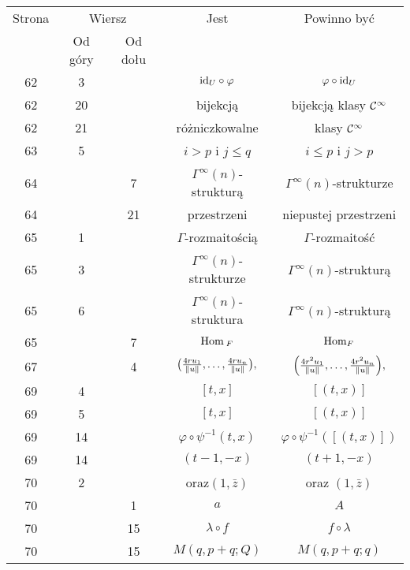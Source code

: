 \documentclass[a4paper,11pt]{article}
\begin{document}
\begin{center}
  \begin{tabular}{|c|c|c|c|c|}
    \hline
    Strona & \multicolumn{2}{c|}{Wiersz} & Jest
                              & Powinno być \\ \cline{2-3}
    & Od góry & Od dołu & & \\
    \hline
    62  & \hphantom{0}3 & & $\mathrm{id}_{ U } \circ \varphi$ & $\varphi \circ \mathrm{id}_{ U }$ \\
    62  & 20 & & bijekcją & bijekcją klasy $\mathcal{C}^{ \infty }$ \\
    62  & 21 & & różniczkowalne & klasy $\mathcal{C}^{ \infty }$ \\
    63  & \hphantom{0}5 & & $i > p$ i $j \leq q$ & $i \leq p$ i $j > p$ \\
    64  & & \hphantom{0}7 & $\Gamma^{ \infty }( n )$-strukturą
    & $\Gamma^{ \infty }( n )$-strukturze \\
    64  & & 21 & przestrzeni & niepustej przestrzeni \\
    65  & \hphantom{0}1 & & $\Gamma$-rozmaitością & $\Gamma$-rozmaitość \\
    65  & \hphantom{0}3 & & $\Gamma^{ \infty }( n )$-strukturze
           & $\Gamma^{ \infty }( n )$-strukturą \\
    65  & \hphantom{0}6 & & $\Gamma^{ \infty }( n )$-struktura
           & $\Gamma^{ \infty }( n )$-strukturą \\
    65  & & \hphantom{0}7 & $\mathrm{Hom}_{ \: F }$ & $\mathrm{Hom}_{ F }$ \\
    67  & & \hphantom{0}4 & $\big( \frac{ 4 r u_{ 1 } }{ \lVert{  u  }\rVert }, \ldots,
                 \frac{ 4 r u_{ n } }{ \lVert{  u  }\rVert } \big),$
           & $\left( \frac{ 4 r^{ 2 } u_{ 1 } }{ \lVert{  u  }\rVert }, \ldots,
             \frac{ 4 r^{ 2 } u_{ n } }{ \lVert{  u  }\rVert } \right)\! ,$ \\
    69  & \hphantom{0}4 & & $[ t, x ]$ & $[ ( t, x ) ]$ \\
    69  & \hphantom{0}5 & & $[ t, x ]$ & $[ ( t, x ) ]$ \\
    69  & 14 & & $\varphi \circ \psi^{ -1 }( t, x )$
           & $\varphi \circ \psi^{ -1 }( [ ( t, x ) ] )$ \\
    69  & 14 & & $( t - 1, -x )$ & $( t + 1, -x )$ \\
    70  & \hphantom{0}2 & & oraz$( 1, \bar{ z } )$
    & oraz $( 1, \bar{ z } )$ \\
    70  & & \hphantom{0}1 & $a$ & $A$ \\
    70  & & 15 & $\lambda \circ f$ & $f \circ \lambda$ \\
    70  & & 15 & $M( q, p + q; Q )$ & $M( q, p + q; q )$ \\

\end{tabular}
\end{center}
\end{document}
